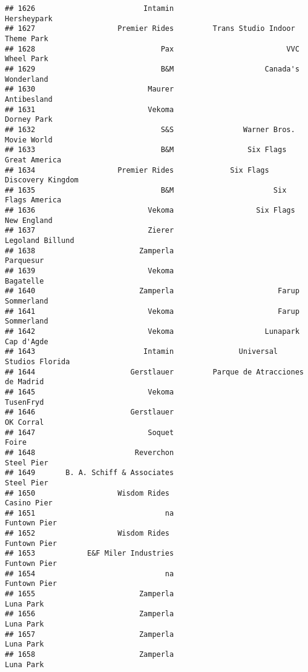 \documentclass[
]{article}
\begin{document}
\begin{verbatim}
## 1626                         Intamin                             Hersheypark
## 1627                   Premier Rides         Trans Studio Indoor Theme Park 
## 1628                             Pax                          VVC Wheel Park
## 1629                             B&M                     Canada's Wonderland
## 1630                          Maurer                             Antibesland
## 1631                          Vekoma                             Dorney Park
## 1632                             S&S                Warner Bros. Movie World
## 1633                             B&M                 Six Flags Great America
## 1634                   Premier Rides             Six Flags Discovery Kingdom
## 1635                             B&M                       Six Flags America
## 1636                          Vekoma                   Six Flags New England
## 1637                          Zierer                        Legoland Billund
## 1638                        Zamperla                               Parquesur
## 1639                          Vekoma                               Bagatelle
## 1640                        Zamperla                        Farup Sommerland
## 1641                          Vekoma                        Farup Sommerland
## 1642                          Vekoma                     Lunapark Cap d'Agde
## 1643                         Intamin               Universal Studios Florida
## 1644                      Gerstlauer         Parque de Atracciones de Madrid
## 1645                          Vekoma                               TusenFryd
## 1646                      Gerstlauer                               OK Corral
## 1647                          Soquet                                   Foire
## 1648                       Reverchon                              Steel Pier
## 1649       B. A. Schiff & Associates                              Steel Pier
## 1650                   Wisdom Rides                              Casino Pier
## 1651                              na                            Funtown Pier
## 1652                   Wisdom Rides                             Funtown Pier
## 1653            E&F Miler Industries                            Funtown Pier
## 1654                              na                            Funtown Pier
## 1655                        Zamperla                               Luna Park
## 1656                        Zamperla                               Luna Park
## 1657                        Zamperla                               Luna Park
## 1658                        Zamperla                               Luna Park

\end{verbatim}
\end{document}
